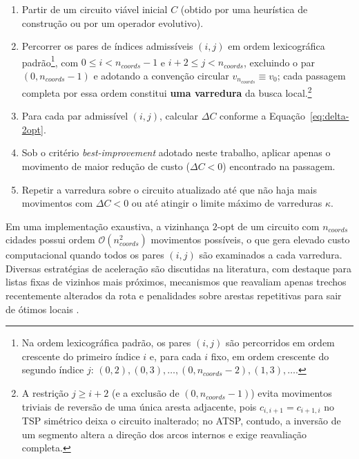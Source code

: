 \begin{enumerate}
      \item
            Partir de um circuito viável inicial \(C\) (obtido por uma heurística de construção ou por um operador evolutivo).
      \item
            Percorrer os pares de índices admissíveis \((i,j)\) em ordem lexicográfica padrão\footnote{Na ordem lexicográfica padrão, os pares \((i,j)\) são percorridos em ordem crescente do primeiro índice \(i\) e, para cada \(i\) fixo, em ordem crescente do segundo índice \(j\): \((0,2), (0,3), \dots, (0,n_{coords}-2), (1,3), \dots\).}, com \(0 \leq i < n_{coords}-1\) e \(i+2 \leq j < n_{coords}\), excluindo o par \((0, n_{coords}-1)\) e adotando a convenção circular \(v_{n_{coords}} \equiv v_0\); cada passagem completa por essa ordem constitui \textbf{uma varredura} da busca local.\footnote{A restrição \(j \geq i+2\) (e a exclusão de \((0, n_{coords}-1)\)) evita movimentos triviais de reversão de uma única aresta adjacente, pois \(c_{i,i+1} = c_{i+1,i}\) no TSP simétrico deixa o circuito inalterado; no ATSP, contudo, a inversão de um segmento altera a direção dos arcos internos e exige reavaliação completa.}
      \item
            Para cada par admissível \((i,j)\), calcular \(\Delta C\) conforme a Equação~\eqref{eq:delta-2opt}.
      \item
            Sob o critério \emph{best-improvement} adotado neste trabalho, aplicar apenas o movimento de maior redução de custo (\(\Delta C < 0\)) encontrado na passagem.
      \item
            Repetir a varredura sobre o circuito atualizado até que não haja mais movimentos com \(\Delta C < 0\) ou até atingir o limite máximo de varreduras \(\kappa\).
\end{enumerate}

Em uma implementação exaustiva, a vizinhança \(2\)-opt de um circuito com \(n_{coords}\) cidades possui ordem \(\mathcal{O}(n_{coords}^2)\) movimentos possíveis, o que gera elevado custo computacional quando todos os pares \((i,j)\) são examinados a cada varredura.
Diversas estratégias de aceleração são discutidas na literatura, com destaque para listas fixas de vizinhos mais próximos, mecanismos que reavaliam apenas trechos recentemente alterados da rota e penalidades sobre arestas repetitivas para sair de ótimos locais \autocite{lin1973efficient,voudouris1999tsp,larranaga1999genetic}.

